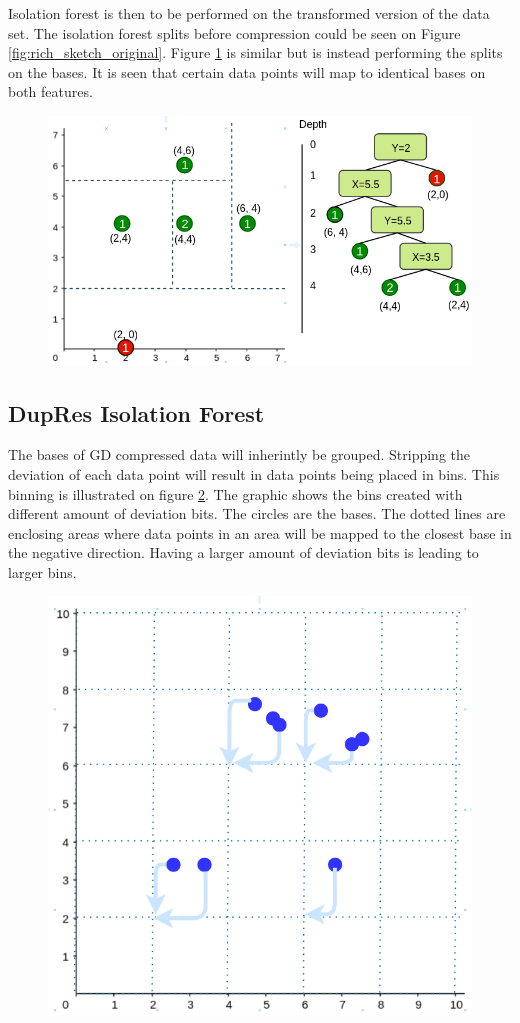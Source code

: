 Isolation forest is then to be performed on the transformed version of the data set. The isolation forest splits before compression could be seen on Figure \ref{fig:rich_sketch_original}. Figure \ref{fig:rich_sketch_bases} is similar but is instead performing the splits on the bases. It is seen that certain data points will map to identical bases on both features.  

\begin{figure}
  \centering
  \includegraphics[width=\linewidth]{images/rich_sketch_bases.png}
  \caption{}
  \label{fig:rich_sketch_bases}
\end{figure}


\subsection{DupRes Isolation Forest}
The bases of GD compressed data will inherintly be grouped. Stripping the deviation of each data point will result in data points being placed in bins. This binning is illustrated on figure \ref*{fig:binning}. The graphic shows the bins created with different amount of deviation bits. The circles are the bases. The dotted lines are enclosing areas where data points in an area will be mapped to the closest base in the negative direction. Having a larger amount of deviation bits is leading to larger bins. 

\begin{figure}
  \centering
  \includegraphics[width=0.5\linewidth]{images/binning-1dev.png}
  \caption{}
  \label{fig:binning}
\end{figure}

